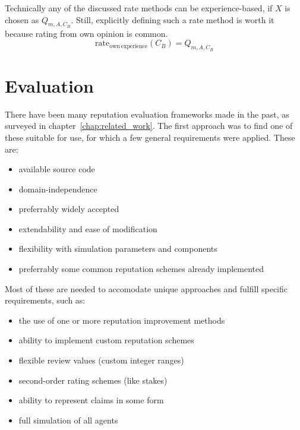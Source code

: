 \documentclass[%
    ]{\PathToTumTemplate/thesis/tum_thesis}
\begin{document}
Technically any of the discussed rate methods can be experience-based, if $X$ is chosen as $Q_{m,A,C_{B}}$.
Still, explicitly defining such a rate method is worth it because rating from own opinion is common.
\begin{equation}\label{eq:rate_own_experience}
\mathrm{rate_{own~experience}}(C_B) = Q_{m,A,C_{B}}
\end{equation}



\section{Evaluation}\label{sec:approach_evaluation_framework}


There have been many reputation evaluation frameworks made in the past, as surveyed in chapter~\ref{chap:related_work}.
The first approach was to find one of these suitable for use, for which a few general requirements were applied.
These are:
\begin{itemize}
    \item available source code
    \item domain-independence
    \item preferrably widely accepted
    \item extendability and ease of modification
    \item flexibility with simulation parameters and components
    \item preferrably some common reputation schemes already implemented
\end{itemize}

Most of these are needed to accomodate unique approaches and fulfill specific requirements, such as:
\begin{itemize}
    \item the use of one or more reputation improvement methods
	\item ability to implement custom reputation schemes
    \item flexible review values (custom integer ranges)
    \item second-order rating schemes (like stakes)
    \item ability to represent \glspl{claim} in some form
    \item full simulation of all agents
\end{itemize}
\end{document}
